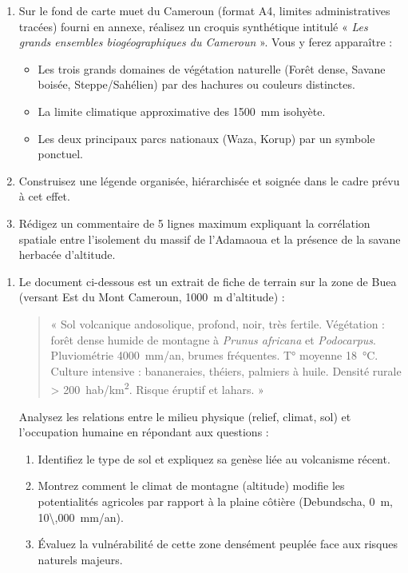 \documentclass[11pt]{article}
\begin{document}
\begin{exercice}
\begin{enumerate}
    \item Sur le fond de carte muet du Cameroun (format A4, limites administratives tracées) fourni en annexe, réalisez un croquis synthétique intitulé « \textit{Les grands ensembles biogéographiques du Cameroun} ». Vous y ferez apparaître :
    \begin{itemize}
        \item Les trois grands domaines de végétation naturelle (Forêt dense, Savane boisée, Steppe/Sahélien) par des hachures ou couleurs distinctes.
        \item La limite climatique approximative des \SI{1500}{mm} isohyète.
        \item Les deux principaux parcs nationaux (Waza, Korup) par un symbole ponctuel.
    \end{itemize}
    \item Construisez une légende organisée, hiérarchisée et soignée dans le cadre prévu à cet effet.
    \item Rédigez un commentaire de 5 lignes maximum expliquant la corrélation spatiale entre l'isolement du massif de l'Adamaoua et la présence de la savane herbacée d'altitude.
\end{enumerate}
\end{exercice}

\begin{exercice}
\begin{enumerate}
    \item Le document ci-dessous est un extrait de fiche de terrain sur la zone de Buea (versant Est du Mont Cameroun, \SI{1000}{m} d'altitude) :
    \begin{quote}
    « Sol volcanique andosolique, profond, noir, très fertile. Végétation : forêt dense humide de montagne à \textit{Prunus africana} et \textit{Podocarpus}. Pluviométrie \SI{4000}{mm/an}, brumes fréquentes. T° moyenne \SI{18}{\celsius}. Culture intensive : bananeraies, théiers, palmiers à huile. Densité rurale > \SI{200}{hab/km^2}. Risque éruptif et lahars. »
    \end{quote}
    Analysez les relations entre le milieu physique (relief, climat, sol) et l'occupation humaine en répondant aux questions :
    \begin{enumerate}
        \item Identifiez le type de sol et expliquez sa genèse liée au volcanisme récent.
        \item Montrez comment le climat de montagne (altitude) modifie les potentialités agricoles par rapport à la plaine côtière (Debundscha, \SI{0}{m}, \SI{10\,000}{mm/an}).
        \item Évaluez la vulnérabilité de cette zone densément peuplée face aux risques naturels majeurs.
    \end{enumerate}
\end{enumerate}
\end{exercice}
\end{document}
